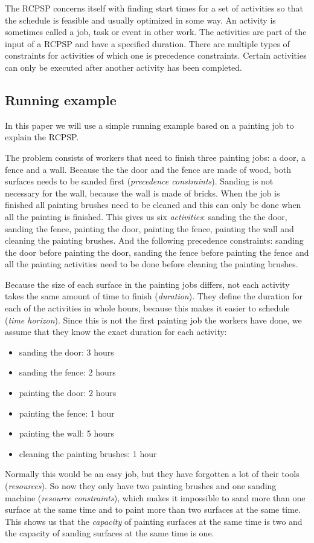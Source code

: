 \documentclass{article}
\theoremstyle{definition}
\begin{document}
The RCPSP concerns itself with finding start times for a set of activities so that the schedule is feasible and usually optimized in some way. 
An activity is sometimes called a job, task or event in other work. 
The activities are part of the input of a RCPSP and have a specified duration. 
There are multiple types of constraints for activities of which one is precedence constraints. 
Certain activities can only be executed after another activity has been completed. 


\subsection{Running example}
In this paper we will use a simple running example based on a painting job to explain the RCPSP.

The problem consists of workers that need to finish three painting jobs: a door, a fence and a wall.
Because the the door and the fence are made of wood, both surfaces needs to be sanded first (\emph{precedence constraints}).
Sanding is not necessary for the wall, because the wall is made of bricks.
When the job is finished all painting brushes need to be cleaned and this can only be done when all the painting is finished.
This gives us six \emph{activities}: sanding the the door, sanding the fence,  painting the door, painting the fence, painting the wall and cleaning the painting brushes.
And the following precedence constraints: sanding the door before painting the door, sanding the fence before painting the fence and all the painting activities need to be done before cleaning the painting brushes.

Because the size of each surface in the painting jobs differs, not each activity takes the same amount of time to finish (\emph{duration}).
They define the duration for each of the activities in whole hours, because this makes it easier to schedule (\emph{time horizon}).
Since this is not the first painting job the workers have done, we assume that they know the exact duration for each activity:
\begin{itemize}
\item sanding the door: 3 hours
\item sanding the fence: 2 hours
\item painting the door: 2 hours
\item painting the fence: 1 hour
\item painting the wall: 5 hours
\item cleaning the painting brushes: 1 hour
\end{itemize}
Normally this would be an easy job, but they have forgotten a lot of their tools (\emph{resources}).
So now they only have two painting brushes and one sanding machine (\emph{resource constraints}), which makes it impossible to sand more than one surface at the same time and to paint more than two surfaces at the same time.
This shows us that the \emph{capacity} of painting surfaces at the same time is two and the capacity of sanding surfaces at the same time is one.
\end{document}
